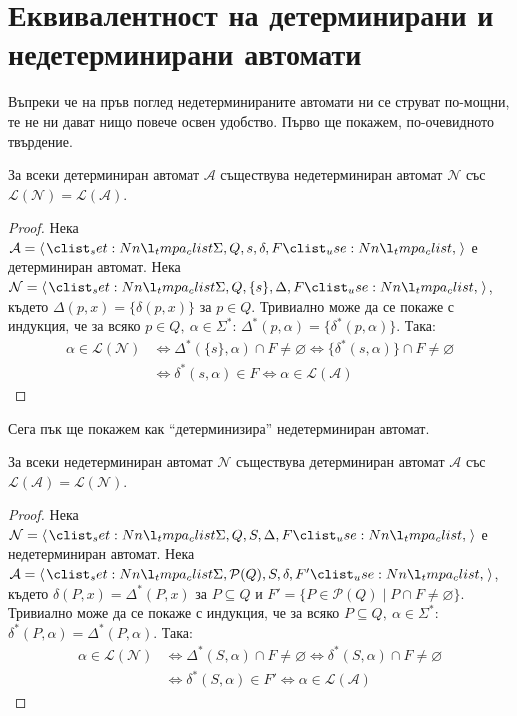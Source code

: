 \section{Еквивалентност на детерминирани и недетерминирани автомати}

Въпреки че на пръв поглед недетерминираните автомати ни се струват по-мощни, те не ни дават нищо повече освен удобство.
Първо ще покажем, по-очевидното твърдение.

\begin{claim}
    За всеки детерминиран автомат $\mathcal{A}$ съществува недетерминиран автомат $\mathcal{N}$ със $\mathcal{L(N) = L(A)}$.
\end{claim}

\begin{proof}
    Нека $\mathcal{A} = \opair{\Sigma, Q, s, \delta, F}$ е детерминиран автомат.
    Нека $\mathcal{N} = \opair{\Sigma, Q, \{ s \}, \Delta, F}$,
    където $\Delta(p, x) = \{ \delta(p, x) \}$ за $p \in Q$.
    Тривиално може да се покаже с индукция, че за всяко $p \in Q, \: \alpha \in \Sigma^*$: $\Delta^*(p, \alpha) = \{ \delta^*(p, \alpha) \}$.
    Така:
    \begin{align*}
        \alpha \in \mathcal{L(N)} & \iff \Delta^*(\{ s \}, \alpha) \cap F \neq \varnothing \iff \{ \delta^*(s, \alpha) \} \cap F \neq \varnothing \\
                                  & \iff \delta^*(s, \alpha) \in F \iff \alpha \in \mathcal{L(A)}
    \end{align*}
\end{proof}

Сега пък ще покажем как ``детерминизира'' недетерминиран автомат.

\begin{claim}
    За всеки недетерминиран автомат $\mathcal{N}$ съществува детерминиран автомат $\mathcal{A}$ със $\mathcal{L(A) = L(N)}$.
\end{claim}

\begin{proof}
    Нека $\mathcal{N} = \opair{\Sigma, Q, S, \Delta, F}$ е недетерминиран автомат.
    Нека $\mathcal{A} = \opair{\Sigma, \mathcal{P}(Q), S, \delta, F'}$,
    където $\delta(P, x) = \Delta^*(P, x)$ за $P \subseteq Q$ и $F' = \{ P \in \mathcal{P}(Q) \mid P \cap F \neq \varnothing \}$.
    Тривиално може да се покаже с индукция, че за всяко $P \subseteq Q, \: \alpha \in \Sigma^*$: $\delta^*(P, \alpha) = \Delta^*(P, \alpha)$.
    Така:
    \begin{align*}
        \alpha \in \mathcal{L(N)} & \iff \Delta^*(S, \alpha) \cap F \neq \varnothing \iff \delta^*(S, \alpha) \cap F \neq \varnothing \\
                                  & \iff \delta^*(S, \alpha) \in F' \iff \alpha \in \mathcal{L(A)}
    \end{align*}
\end{proof}

